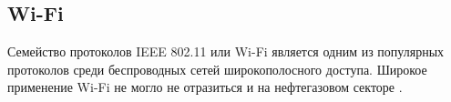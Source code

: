 










\subsection{Wi-Fi}

Семейство протоколов IEEE 802.11 или Wi-Fi является одним из популярных протоколов среди беспроводных сетей широкополосного доступа. Широкое применение Wi-Fi не могло не отразиться и на нефтегазовом секторе \cite{comptek_SMARTField, cisco_oil_gas, cambiumnetworks_wireless,gegridsolutions_wireless}. 

